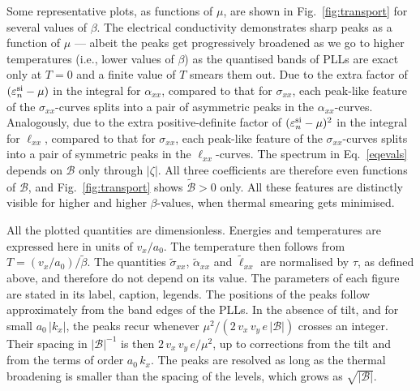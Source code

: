 \documentclass[aps,prb, onecolumn, nofootinbib, citeautoscript,10pt]{revtex4-2}
\begin{document}
Some representative plots, as functions of $\mu$, are shown in Fig.~\ref{fig:transport} for several values of $\beta$. The electrical conductivity demonstrates sharp peaks as a function of $\mu$ --- albeit the peaks get progressively broadened as we go to higher temperatures (i.e., lower values of $\beta$) as the quantised bands of PLLs are exact only at $T = 0$ and a finite value of $T$ smears them out. Due to the extra factor of $(\varepsilon^{{\rm si }}_n - \mu)$ in the integral for $\alpha_{xx}$, compared to that for $ \sigma_{xx}$, each peak-like feature of the $\sigma_{xx}$-curves splits into a pair of asymmetric peaks in the $\alpha_{xx}$-curves. Analogously, due to the extra positive-definite factor of $(\varepsilon^{ {\rm si }}_n - \mu)^2 $ in the integral for $\ell_{xx}$, compared to that for $ \sigma_{xx}$, each peak-like feature of the $\sigma_{xx}$-curves splits into a pair of symmetric peaks in the $ \ell_{xx}$-curves. The spectrum in Eq.~\eqref{eqevals} depends on $\mathcal B$ only through $|\zeta|$. All three coefficients are therefore even functions of $\mathcal B$, and Fig.~\ref{fig:transport} shows $\tilde{\mathcal B}>0$ only.
All these features are distinctly visible for higher and higher $\beta$-values, when thermal smearing gets minimised. 


All the plotted quantities are dimensionless. Energies and temperatures are expressed here in units of $v_x/a_0$. The temperature then follows from $T=(v_x/a_0)/\tilde\beta$. The quantities $\tilde\sigma_{xx}$, $\tilde\alpha_{xx}$ and $\tilde\ell_{xx}$ are normalised by $\tau$, as defined above, and therefore do not depend on its value. The parameters of each figure are stated in its label, caption, legends. The positions of the peaks follow approximately from the band edges of the PLLs. In the absence of tilt, and for small $a_0\,|k_x|$, the peaks recur whenever $\mu^2/(2\,v_x\,v_y\,e\,|\mathcal B|)$ crosses an integer. Their spacing in $|\mathcal B|^{-1}$ is then $2\,v_x\,v_y\,e/\mu^2$, up to corrections from the tilt and from the terms of order $a_0\,k_x$. The peaks are resolved as long as the thermal broadening is smaller than the spacing of the levels, which grows as $\sqrt{|\mathcal B|}$.
\end{document}
